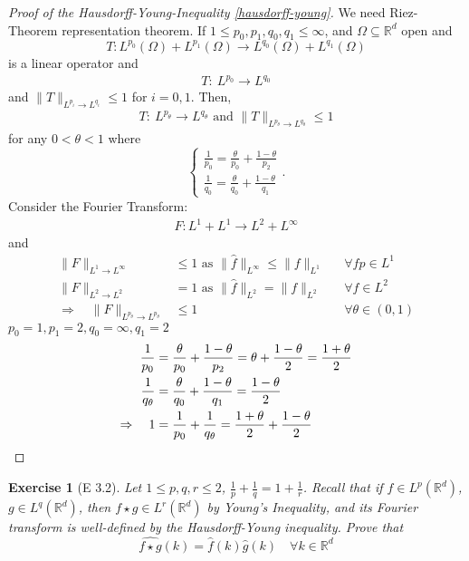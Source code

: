 \documentclass{report}
\theoremstyle{tommy}
\newtheorem{ex}[defn]{Exercise}
\begin{document}
  \begin{proof}[Proof of the Hausdorff-Young-Inequality \ref{hausdorff-young}]
    We need Riez-Theorem representation theorem. If \(1 \le p_0, p_1, q_0, q_1 \le \infty\), and \(\Omega \subseteq \mathbb{R}^d\) open and 
    \[T: L^{p_0}(\Omega) + L^{p_1}(\Omega) \longrightarrow L^{q_0}(\Omega) + L^{q_1}(\Omega)\]
    is a linear operator and
    \begin{align*}
      T: \ L^{p_0} \to L^{q_0}
    \end{align*}
    and \(\|T\|_{L^{p_i} \to L^{q_i}} \le 1\) for \(i = 0, 1.\) Then,
    \begin{align*}
      T: \ L^{p_\theta} \to L^{q_\theta} \text{ and } \|T\|_{L^{p_\theta} \to L^{q_\theta}} \le 1
    \end{align*}  
    for any \(0 < \theta < 1\) where 
    \[\begin{cases}
      \frac{1}{p_0} = \frac{\theta}{p_0} + \frac{1 - \theta}{p_2} \\
      \frac{1}{q_0} = \frac{\theta}{q_0} + \frac{1 - \theta}{q_1}
    \end{cases}.\]
    Consider the Fourier Transform:
    \begin{align*}
      F: L^1 + L^1 \to L^2 + L^\infty 
    \end{align*}
    and
    \begin{align*}
      \|F\|_{L^1 \to L^\infty} &\le 1 \text{ as } \|\hat f\|_{L^\infty} \le \|f\|_{L^1} &&\forall f p \in L^1 \\
      \|F\|_{L^2 \to L^2} &= 1 \text{ as } \| \hat f \|_{L^2} = \|f\|_{L^2} &&\forall f \in L^2 \\
      \Rightarrow\quad  \|F\|_{L^{p_\theta} \to L^{p_\theta}} &\le 1 &&\forall \theta \in (0,1)
    \end{align*}
    \(p_0 = 1, p_1 = 2, q_0 = \infty, q_1 = 2\)
    \begin{align*}
      \frac{1}{p_0} &= \frac{\theta}{p_0} + \frac{1 - \theta}{p_2} = \theta + \frac{1 - \theta}{2} = \frac{1 + \theta}{2} \\
      \frac{1}{q_\theta} &= \frac{\theta}{q_0} + \frac{1 - \theta}{q_1} = \frac{1 - \theta}{2} \\
      \Rightarrow \quad 1 &= \frac{1}{p_0} + \frac{1}{q_\theta} = \frac{1 + \theta}{2} + \frac{1 - \theta}{2} \qedhere
    \end{align*}
  \end{proof}


  \begin{ex}[E 3.2]
    Let \(1 \le p, q, r \le 2\), \(\frac{1}{p} + \frac{1}{q} = 1 + \frac{1}{r}\). Recall that if \(f \in L^p(\mathbb{R}^d)\), \(g \in L^q(\mathbb{R}^d)\), then \(f \star g \in L^r(\mathbb{R}^d)\) by Young's Inequality, and its Fourier transform is well-defined by the Hausdorff-Young inequality. Prove that 
    \[\widehat{f \star g}(k) = \hat f(k) \hat g(k) \quad \forall k \in \mathbb{R}^d\]
  \end{ex}
\end{document}
